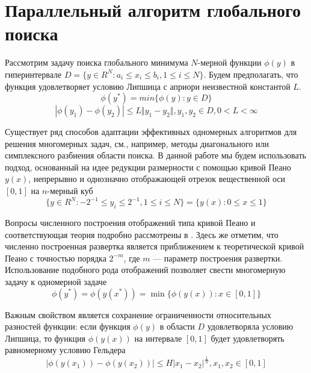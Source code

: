\section{Параллельный алгоритм глобального поиска}
Рассмотрим задачу поиска глобального минимума \(N\)-мерной функции \(\phi(y)\) в гиперинтервале \(D=\{y\in R^N:a_i\leqslant x_i\leqslant{b_i}, 1\leqslant{i}\leqslant{N}\}\). Будем предполагать, что функция удовлетворяет условию Липшица с априори неизвестной константой \(L\).
\begin{equation}
\label{task}
\phi(y^*)=min\{\phi(y):y\in D\}
\end{equation}
\begin{equation}
\label{lip}
|\phi(y_1)-\phi(y_2)|\leqslant L\Vert y_1-y_2\Vert,y_1,y_2\in D,0<L<\infty
\end{equation}
\par
Существует ряд способов адаптации эффективных одномерных алгоритмов для решения многомерных задач, см., например, методы диагонального \cite{sergKvaDiaPaper} или симплексного \cite{zilinsk} разбиения области поиска. В данной работе мы будем использовать подход, основанный на идее редукции размерности с помощью кривой Пеано \(y(x)\), непрерывно и однозначно отображающей отрезок вещественной оси \([0,1]\) на \(n\)-мерный куб 
\begin{displaymath}
\label{cube}
\lbrace y\in R^N:-2^{-1}\leqslant y_i\leqslant 2^{-1},1\leqslant i\leqslant N\rbrace=\{y(x):0\leqslant x\leqslant 1\}
\end{displaymath}
\par
Вопросы численного построения отображений типа кривой Пеано и соответствующая теория подробно рассмотрены в \cite{strSergOptBook}. Здесь же отметим, что численно построенная развертка является приближением к теоретической кривой Пеано с точностью порядка \(2^{-m}\), где \(m\) –-- параметр построения развертки. Использование подобного рода отображений позволяет свести многомерную задачу к одномерной задаче
\begin{displaymath}
\label{oneDimTask}
\phi(y^*)=\phi(y(x^*))=\min\{\phi(y(x)):x\in [0,1]\}
\end{displaymath}
\par
Важным свойством является сохранение ограниченности относительных разностей функции: если функция \(\phi(y)\) в области \(D
\) удовлетворяла условию Липшица, то функция \(\phi(y(x))\) на интервале \([0,1]\) будет удовлетворять равномерному условию Гельдера
\begin{displaymath}
\label{holder}
|\phi(y(x_1))-\phi(y(x_2))|\leqslant H{|x_1-x_2|}^{\frac{1}{N}},x_1,x_2\in[0,1]
\end{displaymath}
